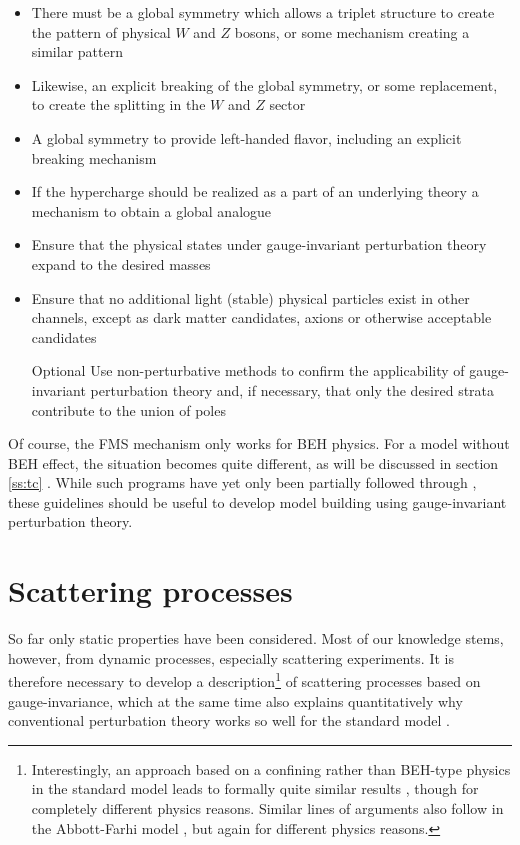 \documentclass[final,12pt]{article}
\newcommand*{\1}{1\!\!\!\bot}
\begin{document}
\begin{itemize}
 \item There must be a global symmetry which allows a triplet structure to create the pattern of physical $W$ and $Z$ bosons, or some mechanism creating a similar pattern
 \item Likewise, an explicit breaking of the global symmetry, or some replacement, to create the splitting in the $W$ and $Z$ sector
 \item A global symmetry to provide left-handed flavor, including an explicit breaking mechanism
 \item If the hypercharge should be realized as a part of an underlying theory a mechanism to obtain a global analogue
 \item Ensure that the physical states under gauge-invariant perturbation theory expand to the desired masses
 \item Ensure that no additional light (stable) physical particles exist in other channels, except as dark matter candidates, axions or otherwise acceptable candidates
 \item[Optional] Use non-perturbative methods to confirm the applicability of gauge-invariant perturbation theory and, if necessary, that only the desired strata contribute to the union of poles
\end{itemize}
Of course, the FMS mechanism only works for BEH physics. For a model without BEH effect, the situation becomes quite different, as will be discussed in section \ref{ss:tc} \cite{Maas:2015gma}. While such programs have yet only been partially followed through \cite{Maas:2015gma,Maas:2016qpu,Maas:2017xzh}, these guidelines should be useful to develop model building using gauge-invariant perturbation theory.

\section{Scattering processes}\label{s:scattering}

So far only static properties have been considered. Most of our knowledge stems, however, from dynamic processes, especially scattering experiments. It is therefore necessary to develop a description\footnote{Interestingly, an approach based on a confining rather than BEH-type physics in the standard model leads to formally quite similar results \cite{Calmet:2000th,Calmet:2001rp,Calmet:2001yd,Calmet:2002mf}, though for completely different physics reasons. Similar lines of arguments \cite{Dosch:1983hr,Dosch:1984ec} also follow in the Abbott-Farhi model \cite{Abbott:1981re}, but again for different physics reasons.} of scattering processes based on gauge-invariance, which at the same time also explains quantitatively why conventional perturbation theory works so well for the standard model \cite{pdg}.
\end{document}
